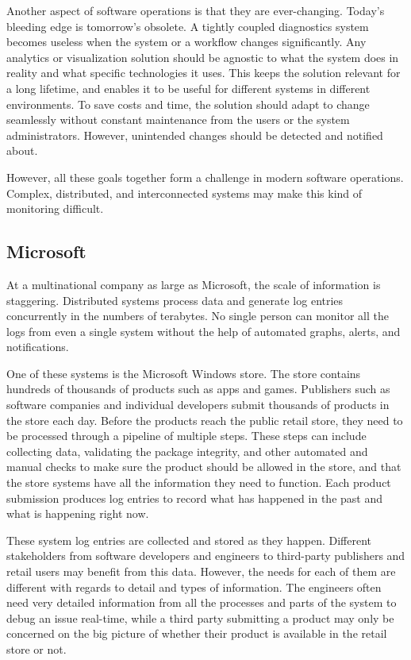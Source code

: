 Another aspect of software operations is that they are ever-changing. 
Today's bleeding edge is tomorrow's obsolete. A tightly coupled diagnostics system
becomes useless when the system or a workflow changes significantly. Any analytics or visualization solution should
be agnostic to what the system does in reality and what specific technologies it uses. 
This keeps the solution relevant for a long lifetime, 
and enables it to be useful for different systems in different environments. 
To save costs and time, the solution should adapt to change seamlessly without constant maintenance from the users or the system administrators. However, unintended changes should be detected and notified about.

However, all these goals together form a challenge in modern software operations.
Complex, distributed, and interconnected systems may make this kind of monitoring difficult.

\subsection{Microsoft}
At a multinational company as large as Microsoft, the scale of information is staggering.
Distributed systems process data and generate log entries concurrently in the numbers of terabytes.
No single person can monitor all the logs from even a single system without the help of automated
graphs, alerts, and notifications.  

One of these systems is the Microsoft Windows store. The store contains hundreds of thousands of products
such as apps and games. Publishers such as software companies and individual developers submit thousands of 
products in the store each day. Before the products reach the public retail store, they need to be processed
through a pipeline of multiple steps. These steps can include collecting data, validating the package integrity, and
other automated and manual checks to make sure the product should be allowed in the store, 
and that the store systems have all the information they need to function.
Each product submission produces log entries to record what has happened in the past and what is happening right now.

These system log entries are collected and stored as they happen. 
Different stakeholders from software developers and engineers to third-party publishers and retail users 
may benefit from this data. However, the needs for each of them are
different with regards to detail and types of information.
The engineers often need very detailed information from all the processes and parts of the system to debug an issue real-time,
while a third party submitting a product may only be concerned on the big picture of whether their 
product is available in the retail store or not.

